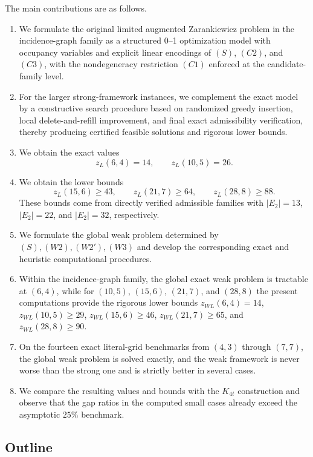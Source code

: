 \documentclass[10pt]{article}
\newcommand{\blue}[1]{#1}
\newcommand{\0}{\mathbf{0}}
\newcommand{\1}{\mathbf{1}}
\begin{document}
The main contributions are as follows.
\begin{enumerate}
  \item We formulate the original limited augmented Zarankiewicz problem in the incidence-graph family as a structured 0--1 optimization model with occupancy variables and explicit linear encodings of \((S)\), \((C2)\), and \((C3)\), with the nondegeneracy restriction \((C1)\) enforced at the candidate-family level.
  \item \blue{For the larger strong-framework instances, we complement the exact model by a constructive search procedure based on randomized greedy insertion, {local delete-and-refill improvement}, and final exact admissibility verification, thereby producing certified feasible solutions and rigorous lower bounds.}
  \item We obtain the exact values
  \[
  z_L(6,4)=14,\qquad z_L(10,5)=26.
  \]
  \item We obtain the lower bounds
  \[
  z_L(15,6)\ge 43,\qquad z_L(21,7)\ge 64,\qquad z_L(28,8)\ge 88.
  \]
  \blue{These bounds come from directly verified admissible families with \(|E_2|=13\), \(|E_2|=22\), and \(|E_2|=32\), respectively.}
  \item \blue{We formulate the global weak problem determined by \((S),(W2),(W2'),(W3)\) and develop the corresponding exact and heuristic computational procedures.}
  \item \blue{Within the incidence-graph family, the global exact weak problem is tractable at \((6,4)\), while for \((10,5)\), \((15,6)\), \((21,7)\), and \((28,8)\) the present computations provide the rigorous lower bounds \(z_{WL}(6,4)=14\), \(z_{WL}(10,5)\ge 29\), \(z_{WL}(15,6)\ge 46\), \(z_{WL}(21,7)\ge 65\), and \(z_{WL}(28,8)\ge 90\).}
  \item \blue{On the fourteen exact literal-grid benchmarks from \((4,3)\) through \((7,7)\), the global weak problem is solved exactly, and the weak framework is never worse than the strong one and is strictly better in several cases.}
  \item We compare the resulting values and bounds with the \(K_{4t}\) construction and observe that the gap ratios in the computed small cases already exceed the asymptotic \(25\%\) benchmark.
\end{enumerate}

\subsection*{Outline}
\end{document}

